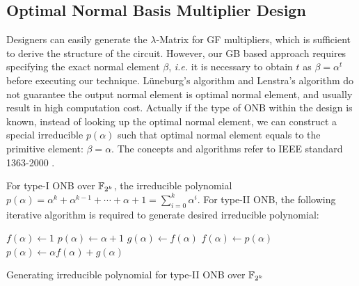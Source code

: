 \subsection{Optimal Normal Basis Multiplier Design}
Designers can easily generate the $\lambda$-Matrix for GF multipliers, which is sufficient to derive the 
structure of the circuit. However, our GB based approach requires specifying the exact normal element $\beta$,
{\it i.e. } it is necessary to obtain $t$ as $\beta = \alpha^t$ before executing our technique.
L\"uneburg's algorithm and Lenstra's algorithm do not guarantee the output normal element is optimal 
normal element, and usually result in high computation cost. Actually if the type of ONB within the design 
is known, instead of looking up the optimal normal element, we can construct a special irreducible $p(\alpha)$
such that optimal normal element equals to the primitive element: $\beta=\alpha$. The concepts and algorithms 
refer to IEEE standard 1363-2000 \cite{IEEE1363}.

For type-I ONB over ${\mathbb{F}}_{2^k}$, the irreducible polynomial $p(\alpha) = \alpha^k+\alpha^{k-1}+\cdots+\alpha+1
= \sum_{i=0}^k \alpha^i$. For type-II ONB, the following iterative algorithm is required to generate desired 
irreducible polynomial:

\begin{algorithm}[H]
\SetAlgoNoLine
\LinesNumbered

  $f(\alpha)\gets 1$\;
  $p(\alpha)\gets \alpha+1$\;
  {
  	$g(\alpha)\gets f(\alpha)$\;
	$f(\alpha)\gets p(\alpha)$\;
	$p(\alpha)\gets \alpha f(\alpha)+g(\alpha)$\;
  }\
\caption {Generating irreducible polynomial for type-II ONB over ${\mathbb{F}}_{2^k}$}
\label{alg:ieee1363}
\end{algorithm}
\DecMargin{1em}
\vspace{0.2in}

